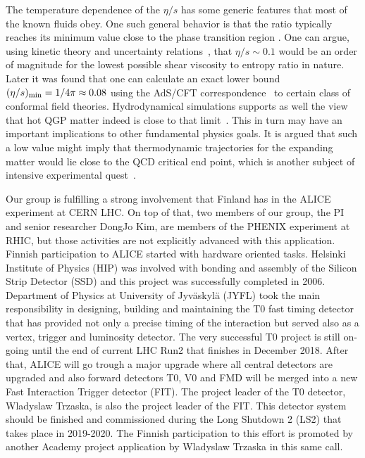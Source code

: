 The temperature dependence of the $\eta/s$ has some generic features that most of the known fluids obey. One such general behavior is that the ratio typically reaches its minimum value close to the phase transition region \cite{PhysRevLett.98.092301}. One can argue, using kinetic theory and uncertainty relations~\cite{PhysRevD.31.53}, that $\eta/s\sim0.1$ would be an order of magnitude for the lowest possible shear viscosity to entropy ratio in nature. Later it was found that one can calculate an exact lower bound $(\eta/s)_{\rm min}=1/4\pi\approx0.08$ using the AdS/CFT correspondence~\cite{PhysRevLett.94.111601} to certain class of conformal field theories. Hydrodynamical simulations supports as well the view that hot QGP matter indeed is close to that limit~\cite{Gale:2012rq}. This in turn may have an important implications to other fundamental physics goals. It is argued that such a low value might imply that thermodynamic trajectories for the expanding matter would lie close to the QCD critical end point, which is another subject of intensive experimental quest~\cite{PhysRevLett.98.092301}.

Our group is fulfilling a strong involvement that Finland has in the ALICE experiment at CERN LHC. On top of that, two members of our group, the PI and senior researcher DongJo Kim, are members of the PHENIX experiment at RHIC, but those activities are not explicitly advanced with this application. Finnish participation to ALICE started with hardware oriented tasks. Helsinki Institute of Physics (HIP) was involved with bonding and assembly of the Silicon Strip Detector (SSD) and this project was successfully completed in 2006. Department of Physics at University of Jyv\"askyl\"a (JYFL) took the main responsibility in designing, building and maintaining the T0 fast timing detector that has provided not only a precise timing of the interaction but served also as a vertex, trigger and luminosity detector. The very successful T0 project is still on-going until the end of current LHC Run2 that finishes in December 2018. After that, ALICE will go trough a major upgrade where all central detectors are upgraded and also forward detectors T0, V0 and FMD will be merged into a new Fast Interaction Trigger detector  (FIT). The project leader of the T0 detector, Wladyslaw Trzaska, is also the project leader of the FIT. 
This detector system should be finished and commissioned during the Long Shutdown 2 (LS2) that takes place in 2019-2020. The Finnish participation to this effort is promoted by another Academy project application by Wladyslaw Trzaska in this same call.

